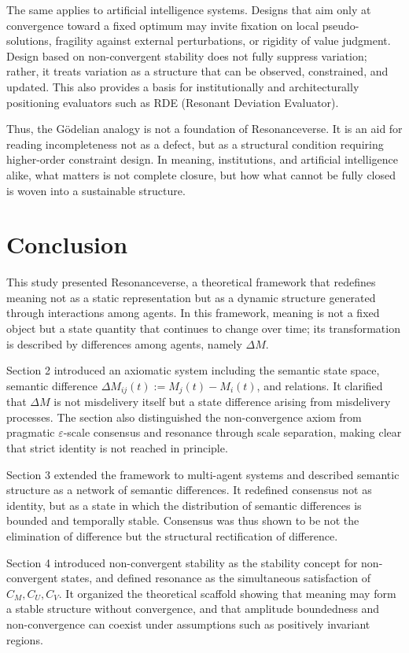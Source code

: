 \documentclass[11pt,a4paper]{article}
\theoremstyle{definition}
\begin{document}
The same applies to artificial intelligence systems. Designs that aim only at convergence toward a fixed optimum may invite fixation on local pseudo-solutions, fragility against external perturbations, or rigidity of value judgment. Design based on non-convergent stability does not fully suppress variation; rather, it treats variation as a structure that can be observed, constrained, and updated. This also provides a basis for institutionally and architecturally positioning evaluators such as RDE (Resonant Deviation Evaluator).

Thus, the G\"odelian analogy is not a foundation of Resonanceverse. It is an aid for reading incompleteness not as a defect, but as a structural condition requiring higher-order constraint design. In meaning, institutions, and artificial intelligence alike, what matters is not complete closure, but how what cannot be fully closed is woven into a sustainable structure.



\section{Conclusion}

This study presented Resonanceverse, a theoretical framework that redefines meaning not as a static representation but as a dynamic structure generated through interactions among agents. In this framework, meaning is not a fixed object but a state quantity that continues to change over time; its transformation is described by differences among agents, namely $\Delta M$.

Section 2 introduced an axiomatic system including the semantic state space, semantic difference $\Delta M_{ij}(t) := M_j(t) - M_i(t)$, and relations. It clarified that $\Delta M$ is not misdelivery itself but a state difference arising from misdelivery processes. The section also distinguished the non-convergence axiom from pragmatic $\varepsilon$-scale consensus and resonance through scale separation, making clear that strict identity is not reached in principle.

Section 3 extended the framework to multi-agent systems and described semantic structure as a network of semantic differences. It redefined consensus not as identity, but as a state in which the distribution of semantic differences is bounded and temporally stable. Consensus was thus shown to be not the elimination of difference but the structural rectification of difference.

Section 4 introduced non-convergent stability as the stability concept for non-convergent states, and defined resonance as the simultaneous satisfaction of $C_M, C_U, C_V$. It organized the theoretical scaffold showing that meaning may form a stable structure without convergence, and that amplitude boundedness and non-convergence can coexist under assumptions such as positively invariant regions.
\end{document}
